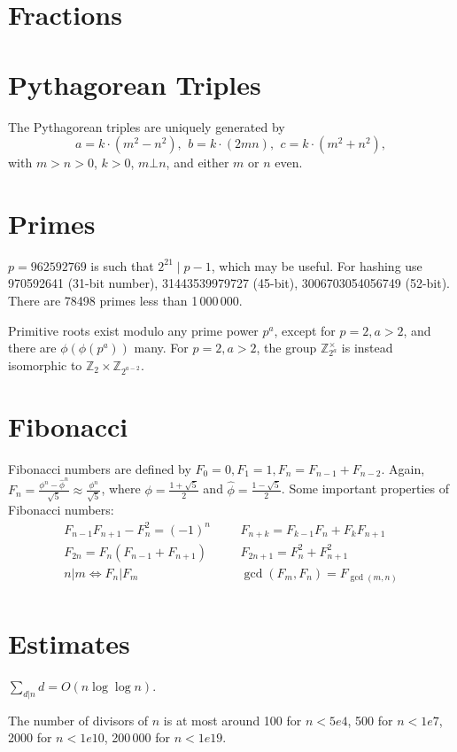 \section{Fractions}

\section{Pythagorean Triples}
 The Pythagorean triples are uniquely generated by
 \[ a=k\cdot (m^{2}-n^{2}),\ \,b=k\cdot (2mn),\ \,c=k\cdot (m^{2}+n^{2}), \]
 with $m > n > 0$, $k > 0$, $m \bot n$, and either $m$ or $n$ even.

\section{Primes}
	$p=962592769$ is such that $2^{21} \mid p-1$, which may be useful. For hashing
	use 970592641 (31-bit number), 31443539979727 (45-bit), 3006703054056749
	(52-bit). There are 78498 primes less than 1\,000\,000.

	Primitive roots exist modulo any prime power $p^a$, except for $p = 2, a > 2$, and there are $\phi(\phi(p^a))$ many.
	For $p = 2, a > 2$, the group $\mathbb Z_{2^a}^\times$ is instead isomorphic to $\mathbb Z_2 \times \mathbb Z_{2^{a-2}}$.
\section{Fibonacci}
Fibonacci numbers are defined by $F_0 = 0, F_1 = 1, F_n = F_{n-1} + F_{n-2}$. Again, $F_n = \frac{\phi^n - \hat{\phi}^n}{\sqrt{5}} \approx \frac{\phi^n}{\sqrt{5}} $, where $\phi = \frac{1 + \sqrt{5}}{2}$ and $\hat{\phi} = \frac{1 - \sqrt{5}}{2}$.
Some important properties of Fibonacci numbers:
\begin{align*}
  F_{n-1}F_{n+1} - F_n^2 = (-1)^n &&& F_{n+k} = F_{k-1}F_{n} + F_kF_{n+1} \\
  F_{2n} = F_n(F_{n-1} + F_{n+1}) &&& F_{2n+1} = F_n^2 + F_{n+1}^2 \\
  n | m \Leftrightarrow F_n | F_m &&& \gcd(F_m, F_n) = F_{\gcd(m,n)} \\
\end{align*}
\section{Estimates}
	$\sum_{d|n} d = O(n \log \log n)$.

	The number of divisors of $n$ is at most around 100 for $n < 5e4$, 500 for $n < 1e7$, 2000 for $n < 1e10$, 200\,000 for $n < 1e19$.

